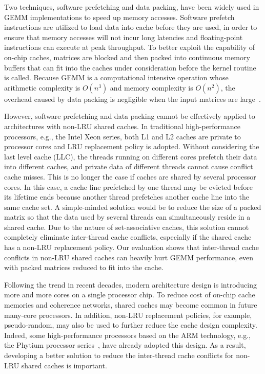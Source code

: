 Two techniques, software prefetching and data packing,
have been widely used in GEMM implementations to speed up memory accesses.
Software prefetch instructions are utilized
to load data into cache before they are used, in 
order to ensure that memory accesses will not incur
long latencies and floating-point instructions
can execute at peak throughput.
To better exploit the capability of on-chip caches,
matrices are blocked and then packed into continuous memory buffers
that can fit into the caches under consideration
before the kernel routine is called.
Because GEMM is a computational intensive operation whose
arithmetic complexity is $O(n^3)$ and memory complexity is $O(n^2)$,
the overhead caused by data packing is negligible when
the input matrices are large~\cite{gotogemm}.


However, software prefetching and data packing cannot be effectively
applied to architectures with non-LRU shared caches.
In traditional high-performance processors, e.g., the Intel Xeon series,
both L1 and L2 caches are private to processor cores
and LRU replacement policy is adopted.
Without considering the last level cache (LLC),
the threads running on different cores prefetch their data into
different caches, and private data of different threads
cannot cause conflict cache misses.
This is no longer the case if caches are shared by several processor cores.
In this case, a cache line prefetched by one thread
may be evicted before its lifetime ends because another thread prefetches
another cache line into the same cache set.
A simple-minded solution would be to reduce 
the size of a packed matrix
so that the data used by several threads can simultaneously reside in a shared cache.
Due to the nature of set-associative caches,
this solution cannot completely eliminate inter-thread cache conflicts,
especially if the shared cache has a non-LRU replacement policy.
Our evaluation shows that inter-thread cache conflicts
in non-LRU shared caches
can heavily hurt GEMM performance,
even with packed matrices reduced to fit into the cache.

Following the trend in recent decades, modern architecture design
is introducing more and more cores on a single processor chip.
To reduce cost of on-chip cache memories and coherence networks,
shared caches may become common in future many-core processors.
In addition, non-LRU replacement policies, for example, pseudo-random,
may also be used to further reduce the cache design complexity.
Indeed, some high-performance processors based on the
ARM technology, e.g., the Phytium processor series~\cite{phytium},
have already adopted this design. 
As a result, developing a better solution to reduce
the inter-thread cache conflicts 
for non-LRU shared caches is important.


